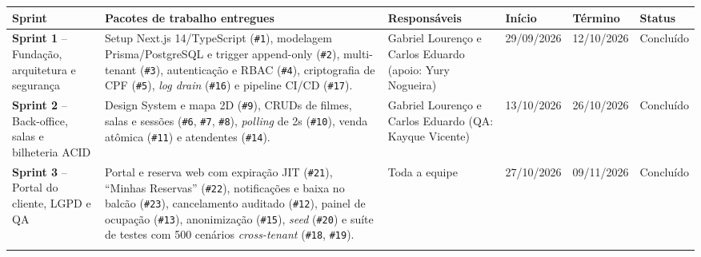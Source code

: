 {\footnotesize
\begin{tabularx}{\textwidth}{>{\hsize\sloppy\arraybackslash}X >{\hsize\sloppy\arraybackslash}X >{\hsize\sloppy\arraybackslash}X C{1.85cm} C{1.85cm} C{1.70cm}}
\toprule
{}
\textbf{Sprint} & \textbf{Pacotes de trabalho entregues} & \textbf{Responsáveis} & \textbf{Início} & \textbf{Término} & \textbf{Status} \\
\midrule
{}
\textbf{Sprint 1} -- Fundação, arquitetura e segurança & Setup Next.js 14/TypeScript (\texttt{\#1}), modelagem Prisma/PostgreSQL e trigger append-only (\texttt{\#2}), multi-tenant (\texttt{\#3}), autenticação e RBAC (\texttt{\#4}), criptografia de CPF (\texttt{\#5}), \emph{log drain} (\texttt{\#16}) e pipeline CI/CD (\texttt{\#17}). & Gabriel Lourenço e Carlos Eduardo (apoio: Yury Nogueira) & 29/09/2026 & 12/10/2026 & Concluído \\
\midrule
\textbf{Sprint 2} -- Back-office, salas e bilheteria ACID & Design System e mapa 2D (\texttt{\#9}), CRUDs de filmes, salas e sessões (\texttt{\#6}, \texttt{\#7}, \texttt{\#8}), \emph{polling} de 2s (\texttt{\#10}), venda atômica (\texttt{\#11}) e atendentes (\texttt{\#14}). & Gabriel Lourenço e Carlos Eduardo (QA: Kayque Vicente) & 13/10/2026 & 26/10/2026 & Concluído \\
\midrule
\textbf{Sprint 3} -- Portal do cliente, LGPD e QA & Portal e reserva web com expiração JIT (\texttt{\#21}), ``Minhas Reservas'' (\texttt{\#22}), notificações e baixa no balcão (\texttt{\#23}), cancelamento auditado (\texttt{\#12}), painel de ocupação (\texttt{\#13}), anonimização (\texttt{\#15}), \emph{seed} (\texttt{\#20}) e suíte de testes com 500 cenários \emph{cross-tenant} (\texttt{\#18}, \texttt{\#19}). & Toda a equipe & 27/10/2026 & 09/11/2026 & Concluído \\
\bottomrule
\end{tabularx}%
}
